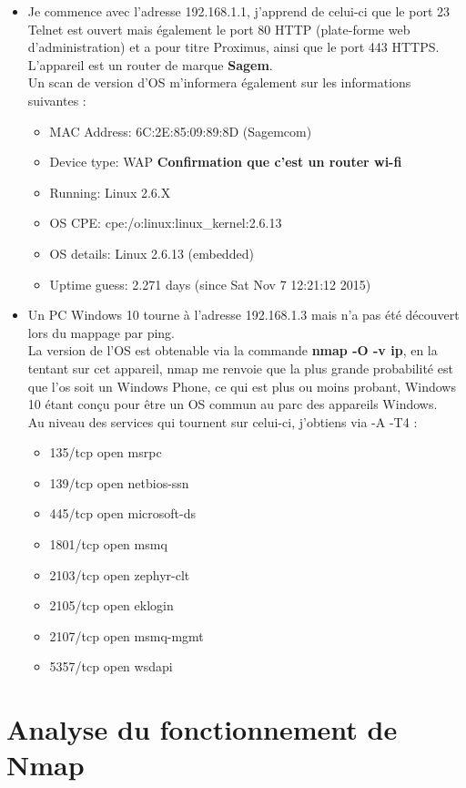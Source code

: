 \documentclass[a4paper,10pt,final,fleqn]{article}
\begin{document}
		\begin{itemize}
			\item Je commence avec l'adresse 192.168.1.1, j'apprend de celui-ci que le port 23 Telnet est ouvert mais également le port 80 HTTP (plate-forme web d'administration) et a pour titre Proximus, ainsi que le port 443 HTTPS.\\

			L'appareil est un router de marque \textbf{Sagem}.\\

			Un scan de version d'OS m'informera également sur les informations suivantes : \\

			\begin{itemize}
				\item MAC Address: 6C:2E:85:09:89:8D (Sagemcom)
				\item Device type: WAP \textbf{Confirmation que c'est un router wi-fi}
				\item Running: Linux 2.6.X
				\item OS CPE: cpe:/o:linux:linux_kernel:2.6.13
				\item OS details: Linux 2.6.13 (embedded)
				\item Uptime guess: 2.271 days (since Sat Nov  7 12:21:12 2015)
			\end{itemize}

			\item Un PC Windows 10 tourne à l'adresse 192.168.1.3 mais n'a pas été découvert lors du mappage par ping.\\

			La version de l'OS est obtenable via la commande \textbf{nmap -O -v ip}, en la tentant sur cet appareil, nmap me renvoie que la plus grande probabilité est que l'os soit un Windows Phone, ce qui est plus ou moins probant, Windows 10 étant conçu pour être un OS commun au parc des appareils Windows.\\

			Au niveau des services qui tournent sur celui-ci, j'obtiens via -A -T4 :\\

			\begin{itemize}
				\item 135/tcp  open  msrpc
				\item 139/tcp  open  netbios-ssn
				\item 445/tcp  open  microsoft-ds
				\item 1801/tcp open  msmq
				\item 2103/tcp open  zephyr-clt
				\item 2105/tcp open  eklogin
				\item 2107/tcp open  msmq-mgmt
				\item 5357/tcp open  wsdapi
			\end{itemize}

		\end{itemize}


	\section{Analyse du fonctionnement de Nmap}
\end{document}

